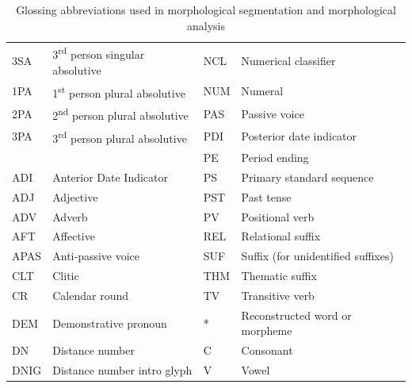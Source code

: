 \documentclass[../main.tex]{subfiles}
\begin{document}
\begin{table}[ht!]
\begin{tabular}{llll}
        3SA            & 3\textsuperscript{rd} person singular absolutive & NCL            & Numerical classifier \\                 
        1PA            & 1\textsuperscript{st} person plural absolutive   & NUM            & Numeral \\                              
        2PA            & 2\textsuperscript{nd} person plural absolutive   & PAS            & Passive voice \\                        
        3PA            & 3\textsuperscript{rd} person plural absolutive   & PDI            & Posterior date indicator \\
                       &                                                  & PE             & Period ending \\
        ADI            & Anterior Date Indicator                          & PS             & Primary standard sequence \\
        ADJ            & Adjective                                        & PST            & Past tense \\
        ADV            & Adverb                                           & PV             & Positional verb \\         
        AFT            & Affective                                        & REL            & Relational suffix \\             
        APAS           & Anti-passive voice                               & SUF            & Suffix (for unidentified suffixes) \\
        CLT            & Clitic                                           & THM            & Thematic suffix \\        
        CR             & Calendar round                                   & TV             & Transitive verb \\     
        DEM            & Demonstrative pronoun                            & *              & Reconstructed word or morpheme \\
        DN             & Distance number                                  & C              & Consonant \\
        DNIG           & Distance number intro glyph                      & V              & Vowel \\
    \end{tabular} 
    \caption{Glossing abbreviations used in morphological segmentation and morphological analysis}
    \label{table:terminology-glossing-abbreviations}
\end{table}
\end{document}
